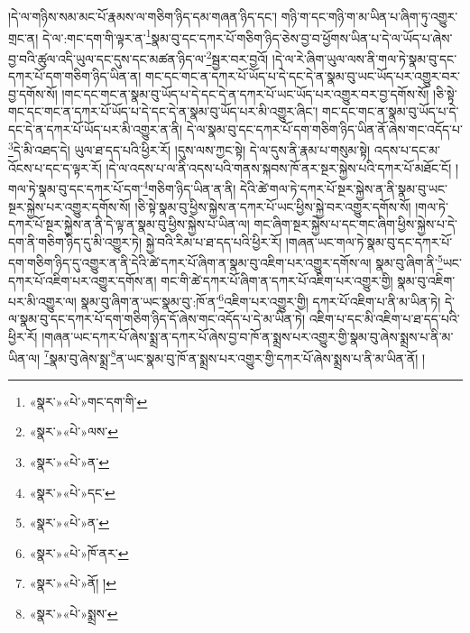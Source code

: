 །དེ་ལ་གཉིས་སམ་མང་པོ་རྣམས་ལ་གཅིག་ཉིད་དམ་གཞན་ཉིད་དང་། གཉི་ག་དང་གཉི་ག་མ་ཡིན་པ་ཞིག་ཏུ་འགྱུར་གྲང་ན། དེ་ལ་:གང་དག་གི་ལྟར་ན་\footnote{«སྣར་»«པེ་»གང་དག་གི་}སྣམ་བུ་དང་དཀར་པོ་གཅིག་ཉིད་ཅེས་བྱ་བ་ཕྱོགས་ཡིན་པ་དེ་ལ་ཡོད་པ་ཞེས་བྱ་བའི་ཚུལ་འདི་ཡུལ་དང་དུས་དང་མཚན་ཉིད་ལ་\footnote{«སྣར་»«པེ་»ལས་}སྦྱར་བར་བྱའོ། །དེ་ལ་རེ་ཞིག་ཡུལ་ལས་ནི་གལ་ཏེ་སྣམ་བུ་དང་དཀར་པོ་དག་གཅིག་ཉིད་ཡིན་ན། གང་དང་གང་ན་དཀར་པོ་ཡོད་པ་དེ་དང་དེ་ན་སྣམ་བུ་ཡང་ཡོད་པར་འགྱུར་བར་བྱ་དགོས་སོ། །གང་དང་གང་ན་སྣམ་བུ་ཡོད་པ་དེ་དང་དེ་ན་དཀར་པོ་ཡང་ཡོད་པར་འགྱུར་བར་བྱ་དགོས་སོ། །ཅི་སྟེ་གང་དང་གང་ན་དཀར་པོ་ཡོད་པ་དེ་དང་དེ་ན་སྣམ་བུ་ཡོད་པར་མི་འགྱུར་ཞིང་། གང་དང་གང་ན་སྣམ་བུ་ཡོད་པ་དེ་དང་དེ་ན་དཀར་པོ་ཡོད་པར་མི་འགྱུར་ན་ནི། དེ་ལ་སྣམ་བུ་དང་དཀར་པོ་དག་གཅིག་ཉིད་ཡིན་ནོ་ཞེས་གང་འདོད་པ་\footnote{«སྣར་»«པེ་»ན་}དེ་མི་འཐད་དེ། ཡུལ་ཐ་དད་པའི་ཕྱིར་རོ། །དུས་ལས་ཀྱང་སྟེ། དེ་ལ་དུས་ནི་རྣམ་པ་གསུམ་སྟེ། འདས་པ་དང་མ་འོངས་པ་དང་ད་ལྟར་རོ། །དེ་ལ་འདས་པ་ལ་ནི་འདས་པའི་གནས་སྐབས་ཁོ་ནར་སྔར་སྐྱེས་པའི་དཀར་པོ་མཐོང་ངོ། །གལ་ཏེ་སྣམ་བུ་དང་དཀར་པོ་དག་\footnote{«སྣར་»«པེ་»དང་}གཅིག་ཉིད་ཡིན་ན་ནི། དེའི་ཚེ་གལ་ཏེ་དཀར་པོ་སྔར་སྐྱེས་ན་ནི་སྣམ་བུ་ཡང་སྔར་སྐྱེས་པར་འགྱུར་དགོས་སོ། །ཅི་སྟེ་སྣམ་བུ་ཕྱིས་སྐྱེས་ན་དཀར་པོ་ཡང་ཕྱིས་སྐྱེ་བར་འགྱུར་དགོས་སོ། །གལ་ཏེ་དཀར་པོ་སྔར་སྐྱེས་ན་ནི་དེ་ལྟ་ན་སྣམ་བུ་ཕྱིས་སྐྱེས་པ་ཡིན་ལ། གང་ཞིག་སྔར་སྐྱེས་པ་དང་གང་ཞིག་ཕྱིས་སྐྱེས་པ་དེ་དག་ནི་གཅིག་ཉིད་དུ་མི་འགྱུར་ཏེ། སྐྱེ་བའི་རིམ་པ་ཐ་དད་པའི་ཕྱིར་རོ། །གཞན་ཡང་གལ་ཏེ་སྣམ་བུ་དང་དཀར་པོ་དག་གཅིག་ཉིད་དུ་འགྱུར་ན་ནི་དེའི་ཚེ་དཀར་པོ་ཞིག་ན་སྣམ་བུ་འཇིག་པར་འགྱུར་དགོས་ལ། སྣམ་བུ་ཞིག་ནི་\footnote{«སྣར་»«པེ་»ན་}ཡང་དཀར་པོ་འཇིག་པར་འགྱུར་དགོས་ན། གང་གི་ཚེ་དཀར་པོ་ཞིག་ན་དཀར་པོ་འཇིག་པར་འགྱུར་གྱི། སྣམ་བུ་འཇིག་པར་མི་འགྱུར་ལ། སྣམ་བུ་ཞིག་ན་ཡང་སྣམ་བུ་:ཁོ་ན་\footnote{«སྣར་»«པེ་»ཁོ་ནར་}འཇིག་པར་འགྱུར་གྱི། དཀར་པོ་འཇིག་པ་ནི་མ་ཡིན་ཏེ། དེ་ལ་སྣམ་བུ་དང་དཀར་པོ་དག་གཅིག་ཉིད་དོ་ཞེས་གང་འདོད་པ་དེ་མ་ཡིན་ཏེ། འཇིག་པ་དང་མི་འཇིག་པ་ཐ་དད་པའི་ཕྱིར་རོ། །གཞན་ཡང་དཀར་པོ་ཞེས་སྨྲ་ན་དཀར་པོ་ཞེས་བྱ་བ་ཁོ་ན་སྨྲས་པར་འགྱུར་གྱི་སྣམ་བུ་ཞེས་སྨྲས་པ་ནི་མ་ཡིན་ལ། \footnote{«སྣར་»«པེ་»ནོ། ། }སྣམ་བུ་ཞེས་སྨྲ་\footnote{«སྣར་»«པེ་»སྨྲས་}ན་ཡང་སྣམ་བུ་ཁོ་ན་སྨྲས་པར་འགྱུར་གྱི་དཀར་པོ་ཞེས་སྨྲས་པ་ནི་མ་ཡིན་ནོ། །
